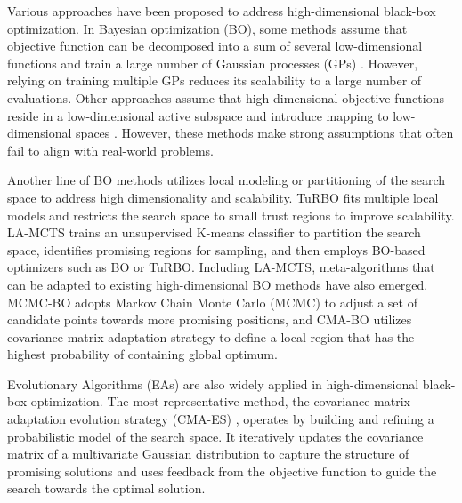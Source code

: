 Various approaches have been proposed to address high-dimensional black-box optimization. In Bayesian optimization (BO), some methods assume that objective function can be decomposed into a sum of several low-dimensional functions and train a large number of Gaussian processes (GPs) \cite{duvenaud2011additive, kandasamy2015high, gardner2017discovering}. However, relying on training multiple GPs reduces its scalability to a large number of evaluations.
Other approaches assume that high-dimensional objective functions reside in a low-dimensional active subspace and introduce mapping to low-dimensional spaces
\cite{chen2012joint, garnett2014active, nayebi2019framework, letham2020re}. However, these methods make strong assumptions that often fail to align with real-world problems.

Another line of BO methods utilizes local modeling or partitioning of the search space to address high dimensionality and scalability. TuRBO \cite{eriksson2019scalable} fits multiple local models and restricts the search space to small trust regions to improve scalability. LA-MCTS \cite{wang2020learning} trains an unsupervised K-means classifier to partition the search space, identifies promising regions for sampling, and then employs BO-based optimizers such as BO or TuRBO. Including LA-MCTS, meta-algorithms that can be adapted to existing high-dimensional BO methods have also emerged. MCMC-BO \cite{yi2024improving} adopts Markov Chain Monte Carlo (MCMC) to adjust a set of candidate points towards more promising positions, and CMA-BO \cite{ngo2024high} utilizes covariance matrix adaptation strategy to define a local region that has the highest probability of containing global optimum.

Evolutionary Algorithms (EAs) are also widely applied in high-dimensional black-box optimization. The most representative method, the covariance matrix adaptation evolution strategy (CMA-ES) \cite{hansen2006cma}, operates by building and refining a probabilistic model of the search space. It iteratively updates the covariance matrix of a multivariate Gaussian distribution to capture the structure of promising solutions and uses feedback from the objective function to guide the search towards the optimal solution.


